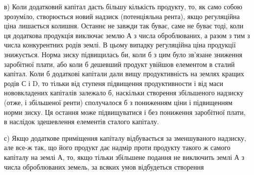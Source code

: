 в) Коли додатковий капітал дасть більшу кількість продукту, то, як само
собою зрозуміло, створюється новий надзиск (потенціяльна рента), якщо регуляційна
ціна лишається колишня. Останнє не завжди так буває, саме не буває
тоді, коли ця додаткова продукція виключає землю А з числа оброблюваних, а
разом з тим з числа конкурентних родів землі. В цьому випадку регуляційна ціна
продукції знижується. Норма зиску підвищилась би, коли б з цим було зв’язане
зниження заробітної плати, або коли б дешевший продукт увійшов елементом
в сталий капітал. Коли б додаткові капітали дали вищу продуктивність на
землях кращих родів С і D, то тільки від ступеня підвищення продуктивности
і від маси нововкладених капіталів залежало б, наскільки створення збільшеного
надзиску (отже, і збільшеної ренти) сполучалося б з пониженням ціни і підвищенням
норми зиску. Ця остання може підвищуватися і без пониження заробітної
плати, в наслідок здешевлення елементів сталого капіталу.

с) Якщо додаткове приміщення капіталу відбувається за зменшуваного
надзиску, але все-ж так, що його продукт дає надмір проти продукту такого ж
самого капіталу на землі А, то, якщо тільки збільшене подання не виключить
землі А з числа оброблюваних земель, за всяких умов відбудеться створення
\parbreak{}  %
